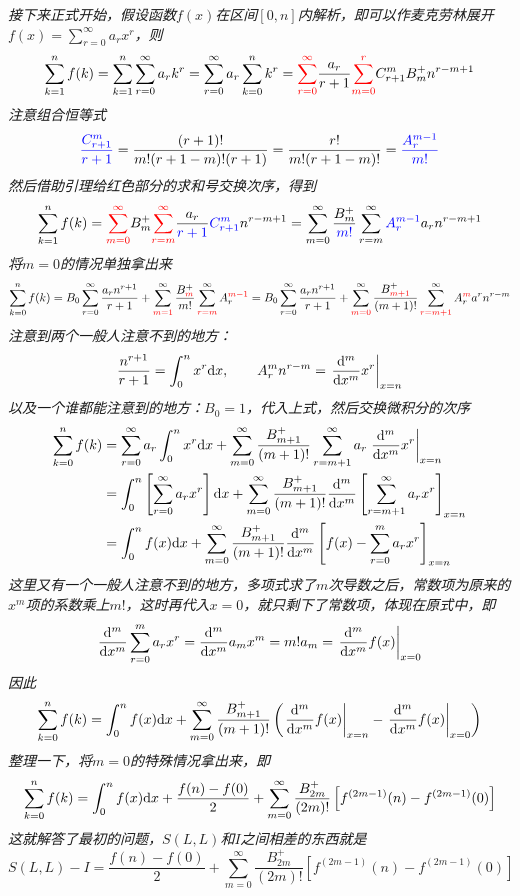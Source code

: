 \documentclass[main.tex]{subfiles}
\begin{document}
\textit{
    接下来正式开始，假设函数\(f(x)\)在区间\([0,n]\)内解析，即可以作麦克劳林展开\(\displaystyle{f(x)=\sum_{r=0}^{\infty}a_rx^r}\)，则
    \[\sum_{k=1}^{n}f(k) = \sum_{k=1}^{n}\sum_{r=0}^{\infty}a_rk^r=\sum_{r=0}^{\infty}a_r\sum_{k=0}^{n}k^r = {\color{red}\sum_{r=0}^{\infty}}\frac{a_r}{r+1}{\color{red}\sum_{m=0}^{r}} C_{r+1}^m B_m^+ n^{r-m+1}\]
    注意组合恒等式
    \[{\color{blue}\frac{C_{r+1}^{m}}{r+1}} = \frac{(r+1)!}{m!(r+1-m)!(r+1)}=\frac{r!}{m!(r+1-m)!} = {\color{blue}\frac{A_{r}^{m-1}}{m!}}\]
    然后借助引理给红色部分的求和号交换次序，得到
    \[\sum_{k=1}^{n}f(k) = {\color{red} \sum_{m=0}^{\infty}}B_m^+{\color{red}\sum_{r=m}^{\infty}}\frac{a_r}{\color{blue}r+1}{\color{blue}C_{r+1}^{m}}n^{r-m+1} = \sum_{m=0}^{\infty}\frac{B_m^+}{\color{blue}m!}\sum_{r=m}^{\infty}{\color{blue}A_{r}^{m-1}}a_rn^{r-m+1}\]
    将\(m=0\)的情况单独拿出来
    \[\sum_{k=0}^{n}f(k) = B_0\sum_{r=0}^{\infty}\frac{a_rn^{r+1}}{r+1} + \sum_{{\color{red} m=1}}^{\infty}\frac{B_{{\color{red}m}}^+}{m!}\sum_{{\color{red}r=m}}^{\infty}A_{r}^{{\color{red}m-1}} = B_0\sum_{r=0}^{\infty}\frac{a_rn^{r+1}}{r+1} + \sum_{{\color{red} m=0}}^{\infty}\frac{B_{{\color{red} m+1}}^+}{(m+1)!}\sum_{{\color{red}r=m+1}}^{\infty}A_r^{{\color{red}m}}a^rn^{r-m}\]
    注意到两个一般人注意不到的地方：
    \[\frac{n^{r+1}}{r+1} = \int_0^nx^r{\rm d}x ,\qquad A_r^mn^{r-m} = \left.\frac{{\rm d}^m}{{\rm d}x^m}x^r\right|_{x=n}\]
    以及一个谁都能注意到的地方：\(B_0=1\)，代入上式，然后交换微积分的次序
    \begin{align*}
        \sum_{k=0}^{n}f(k) &= \sum_{r=0}^{\infty}a_r\int_0^nx^r{\rm d}x + \sum_{m=0}^{\infty}\frac{B_{m+1}^+}{(m+1)!}\sum_{r=m+1}^{\infty}a_r\left.\frac{{\rm d}^m}{{\rm d}x^m}x^r\right|_{x=n} \\
        &= \int_0^n\left[\sum_{r=0}^{\infty}a_rx^r\right]{\rm d}x + \sum_{m=0}^{\infty}\frac{B_{m+1}^+}{(m+1)!}\frac{{\rm d}^m}{{\rm d}x^m}\left[\sum_{r=m+1}^{\infty}a_rx^r\right]_{x=n} \\
        &= \int_0^nf(x){\rm d}x + \sum_{m=0}^{\infty}\frac{B_{m+1}^+}{(m+1)!}\frac{{\rm d}^m}{{\rm d}x^m}\left[f(x) - \sum_{r=0}^{m}a_rx^r\right]_{x=n}
    \end{align*}
    这里又有一个一般人注意不到的地方，多项式求了\(m\)次导数之后，常数项为原来的\(x^m\)项的系数乘上\(m!\)，这时再代入\(x=0\)，就只剩下了常数项，体现在原式中，即
    \[\frac{{\rm d}^m}{{\rm d}x^m}\sum_{r=0}^{m}a_rx^r = \frac{{\rm d}^m}{{\rm d}x^m}a_mx^m = m!a_m = \left.\frac{{\rm d}^m}{{\rm d}x^m}f(x)\right|_{x=0}\]
    因此
    \[\sum_{k=0}^{n}f(k) = \int_0^nf(x){\rm d}x + \sum_{m=0}^{\infty}\frac{B_{m+1}^+}{(m+1)!}\left(\left.\frac{{\rm d}^m}{{\rm d}x^m}f(x)\right|_{x=n} - \left.\frac{{\rm d}^m}{{\rm d}x^m}f(x)\right|_{x=0}\right)\]
    整理一下，将\(m=0\)的特殊情况拿出来，即
    \[\sum_{k=0}^{n}f(k) = \int_0^nf(x){\rm d}x + \frac{f(n)-f(0)}{2} + \sum_{m=0}^{\infty}\frac{B_{2m}^+}{(2m)!}\left[f^{(2m-1)}(n) - f^{(2m-1)}(0)\right]\]
    这就解答了最初的问题，\(S(L,L)\)和\(I\)之间相差的东西就是
    \[S(L,L) - I = \frac{f(n)-f(0)}{2} + \sum_{m=0}^{\infty}\frac{B_{2m}^+}{(2m)!}\left[f^{(2m-1)}(n) - f^{(2m-1)}(0)\right]\]
}
\end{document}
